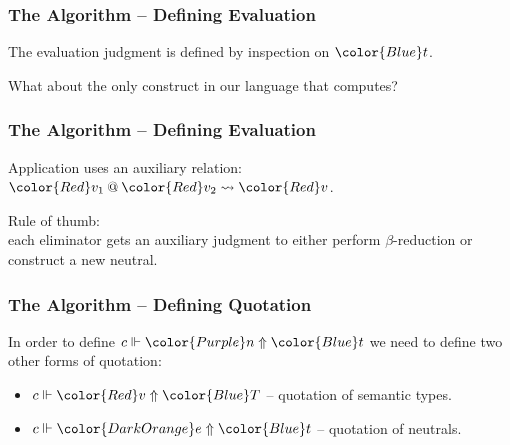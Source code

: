 \documentclass[svgnames]{beamer}
\makeatletter
\newcommand\fmttm[1]{{\color{Blue}#1}}
\newcommand\fmtval[1]{{\color{Red}#1}}
\newcommand\fmtne[1]{{\color{DarkOrange}#1}}
\newcommand\fmtnf[1]{{\color{Purple}#1}}
\newcommand\fmtclo[1]{{\color{Green}#1}}
\newcommand{\Uni}{\fmttm{\mathcal{U}}}
\newcommand{\Unit}{\fmttm{\mathsf{Unit}}}
\newcommand{\unit}{\fmttm{\mathsf{tt}}}
\newcommand{\vUnit}{\fmtval{\mathsf{Unit}}}
\newcommand{\vunit}{\fmtval{\mathsf{tt}}}
\newcommand{\vuni}{\fmtval{\mathsf{Uni}}}
\newcommand{\vpi}[2]{\fmtval{\Pi\,\fmtval{#1}{\color{Black} .}\ \fmtclo{#2}}}
\newcommand{\mkclo}[2]{{\color{Black} \fmttm{#1}\{\fmtval{#2}\}}}
\newcommand{\vlam}[1]{\fmtval{\lambda{\color{Black} .}\ \fmtclo{#1}}}
\newcommand{\vapp}[2]{{\color{Black} \fmtne{\mathsf{app}}(\fmtne{#1}, \fmtnf{#2})}}
\newcommand{\vup}[2]{{\color{Black} \uparrow^{\fmtval{#1}} \fmtne{#2}}}
\newcommand{\vnf}[2]{{\color{Black} \downarrow^{\fmtval{#1}} \fmtval{#2}}}
\newcommand{\var}[1]{\fmttm{\mathbf{x}_{\color{Black} #1}}}
\newcommand{\app}[2]{{\color{Black} \fmttm{#1}(\fmttm{#2})}}
\newcommand{\gpheval}[3]{\fmtval{#1}\models\fmttm{#2}\Downarrow\fmtval{#3}}
\newcommand{\gphapp}[3]{\fmtval{#1}\mathbin{@}\fmtval{#2}\rightsquigarrow\fmtval{#3}}
\newcommand{\gphquone}[3]{#1\Vdash\fmtne{#2}\Uparrow\fmttm{#3}}
\newcommand{\gphquotp}[3]{#1\Vdash\fmtval{#2}\Uparrow\fmttm{#3}}
\newcommand{\gphquonf}[3]{#1\Vdash\fmtnf{#2}\Uparrow\fmttm{#3}}
\makeatother
\begin{document}
\begin{frame}
  \frametitle{The Algorithm -- Defining Evaluation}
  The evaluation judgment is defined by inspection on $\fmttm{t}$.

  \pause
  What about the only construct in our language that computes?
\end{frame}

\begin{frame}
  \frametitle{The Algorithm -- Defining Evaluation}
  Application uses an auxiliary relation: $\gphapp{v_1}{v_2}{v}$.

  Rule of thumb:\\
  \centering
  each eliminator gets an auxiliary judgment to either perform $\beta$-reduction or
  construct a new neutral.
\end{frame}

\begin{frame}
  \frametitle{The Algorithm -- Defining Quotation}
  In order to define $\gphquonf{c}{n}{t}$ we need to define two other forms of quotation:
  \begin{itemize}
  \item $\gphquotp{c}{v}{T}$ -- quotation of \fmtval{semantic types}.\\
  \item $\gphquone{c}{e}{t}$ -- quotation of \fmtne{neutrals}.
  \end{itemize}
\end{frame}
\end{document}
